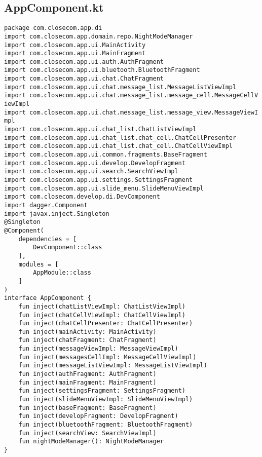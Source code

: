 \documentclass[listing]{espd}
\begin{document}
\subsection{AppComponent.kt}
\begin{verbatim}
package com.closecom.app.di
import com.closecom.app.domain.repo.NightModeManager
import com.closecom.app.ui.MainActivity
import com.closecom.app.ui.MainFragment
import com.closecom.app.ui.auth.AuthFragment
import com.closecom.app.ui.bluetooth.BluetoothFragment
import com.closecom.app.ui.chat.ChatFragment
import com.closecom.app.ui.chat.message_list.MessageListViewImpl
import com.closecom.app.ui.chat.message_list.message_cell.MessageCellV
iewImpl
import com.closecom.app.ui.chat.message_list.message_view.MessageViewI
mpl
import com.closecom.app.ui.chat_list.ChatListViewImpl
import com.closecom.app.ui.chat_list.chat_cell.ChatCellPresenter
import com.closecom.app.ui.chat_list.chat_cell.ChatCellViewImpl
import com.closecom.app.ui.common.fragments.BaseFragment
import com.closecom.app.ui.develop.DevelopFragment
import com.closecom.app.ui.search.SearchViewImpl
import com.closecom.app.ui.settings.SettingsFragment
import com.closecom.app.ui.slide_menu.SlideMenuViewImpl
import com.closecom.develop.di.DevComponent
import dagger.Component
import javax.inject.Singleton
@Singleton
@Component(
    dependencies = [
        DevComponent::class
    ],
    modules = [
        AppModule::class
    ]
)
interface AppComponent {
    fun inject(chatListViewImpl: ChatListViewImpl)
    fun inject(chatCellViewImpl: ChatCellViewImpl)
    fun inject(chatCellPresenter: ChatCellPresenter)
    fun inject(mainActivity: MainActivity)
    fun inject(chatFragment: ChatFragment)
    fun inject(messageViewImpl: MessageViewImpl)
    fun inject(messagesCellImpl: MessageCellViewImpl)
    fun inject(messageListViewImpl: MessageListViewImpl)
    fun inject(authFragment: AuthFragment)
    fun inject(mainFragment: MainFragment)
    fun inject(settingsFragment: SettingsFragment)
    fun inject(slideMenuViewImpl: SlideMenuViewImpl)
    fun inject(baseFragment: BaseFragment)
    fun inject(developFragment: DevelopFragment)
    fun inject(bluetoothFragment: BluetoothFragment)
    fun inject(searchView: SearchViewImpl)
    fun nightModeManager(): NightModeManager
}
\end{verbatim}
\end{document}
